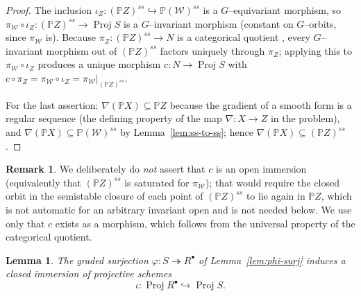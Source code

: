 \documentclass{amsart}
\newtheorem{lemma}{Lemma}
\theoremstyle{definition}
\newtheorem{remark}{Remark}
\DeclareMathOperator{\Proj}{Proj}
\newcommand{\PP}{\mathbb{P}}
\newcommand{\nab}{\nabla}
\begin{document}
\begin{proof}
The inclusion $\iota_Z\colon (\PP Z)^{ss}\hookrightarrow \PP(\mathcal W)^{ss}$ is a
$G$--equivariant morphism, so $\pi_{\mathcal W}\circ\iota_Z\colon (\PP Z)^{ss}\to\Proj S$ is a
$G$--invariant morphism (constant on $G$--orbits, since $\pi_{\mathcal W}$ is). Because
$\pi_Z\colon (\PP Z)^{ss}\to N$ is a categorical quotient
\textup{\cite[Ch.~1, \S 2, Def.~0.5 and Thm.~1.10]{MFK}}, every $G$--invariant morphism out of
$(\PP Z)^{ss}$ factors uniquely through $\pi_Z$; applying this to $\pi_{\mathcal W}\circ\iota_Z$
produces a unique morphism $c\colon N\to\Proj S$ with $c\circ\pi_Z=\pi_{\mathcal W}\circ\iota_Z
=\pi_{\mathcal W}|_{(\PP Z)^{ss}}$.

For the last assertion: $\nab(\PP X)\subseteq\PP Z$ because the gradient of a smooth form is a
regular sequence (the defining property of the map $\nab\colon X\to Z$ in the problem), and
$\nab(\PP X)\subseteq\PP(\mathcal W)^{ss}$ by Lemma~\ref{lem:ss-to-ss}; hence
$\nab(\PP X)\subseteq(\PP Z)^{ss}$.
\end{proof}

\begin{remark}\label{rem:nosaturation}
We deliberately do \emph{not} assert that $c$ is an open immersion (equivalently that
$(\PP Z)^{ss}$ is saturated for $\pi_{\mathcal W}$); that would require the closed orbit in the
semistable closure of each point of $(\PP Z)^{ss}$ to lie again in $\PP Z$, which is not
automatic for an arbitrary invariant open and is not needed below. We use only that $c$ exists
as a morphism, which follows from the universal property of the categorical quotient.
\end{remark}

\begin{lemma}\label{lem:closedimm}
The graded surjection $\varphi\colon S\twoheadrightarrow R^{\bullet}$ of
Lemma~\ref{lem:phi-surj} induces a closed immersion of projective schemes
\[
\iota\colon \Proj R^{\bullet}\hookrightarrow \Proj S .
\]
\end{lemma}
\end{document}
